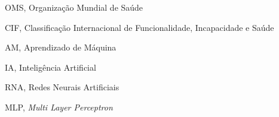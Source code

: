 \begin{siglas}
  \item OMS, Organização Mundial de Saúde
  \item CIF, Classificação Internacional de Funcionalidade, Incapacidade e Saúde
  \item AM, Aprendizado de Máquina
  \item IA, Inteligência Artificial
  \item RNA, Redes Neurais Artificiais
  \item MLP, \textit{Multi Layer Perceptron}
\end{siglas}
